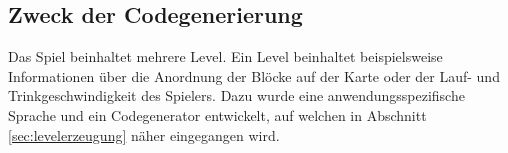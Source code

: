 \subsection{Zweck der Codegenerierung}

Das Spiel beinhaltet mehrere Level.
Ein Level beinhaltet beispielsweise Informationen über die Anordnung der Blöcke auf der Karte oder der Lauf- und Trinkgeschwindigkeit des Spielers.
Dazu wurde eine anwendungsspezifische Sprache und ein Codegenerator entwickelt, auf welchen in Abschnitt \ref{sec:levelerzeugung} näher eingegangen wird.